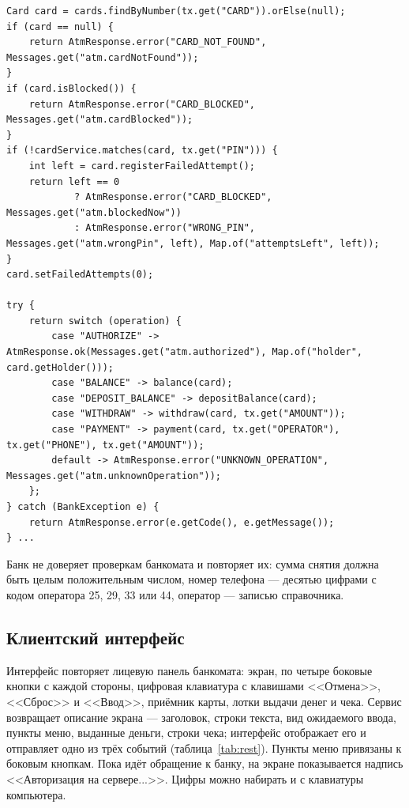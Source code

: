 \documentclass[14pt,a4paper]{extarticle}
\begin{document}
\begin{lstlisting}[style=java, caption={Проверка карты и PIN-кода, выбор операции (\texttt{AtmProcessor.handle})}, label={lst:processor}]
Card card = cards.findByNumber(tx.get("CARD")).orElse(null);
if (card == null) {
    return AtmResponse.error("CARD_NOT_FOUND", Messages.get("atm.cardNotFound"));
}
if (card.isBlocked()) {
    return AtmResponse.error("CARD_BLOCKED", Messages.get("atm.cardBlocked"));
}
if (!cardService.matches(card, tx.get("PIN"))) {
    int left = card.registerFailedAttempt();
    return left == 0
            ? AtmResponse.error("CARD_BLOCKED", Messages.get("atm.blockedNow"))
            : AtmResponse.error("WRONG_PIN", Messages.get("atm.wrongPin", left), Map.of("attemptsLeft", left));
}
card.setFailedAttempts(0);

try {
    return switch (operation) {
        case "AUTHORIZE" -> AtmResponse.ok(Messages.get("atm.authorized"), Map.of("holder", card.getHolder()));
        case "BALANCE" -> balance(card);
        case "DEPOSIT_BALANCE" -> depositBalance(card);
        case "WITHDRAW" -> withdraw(card, tx.get("AMOUNT"));
        case "PAYMENT" -> payment(card, tx.get("OPERATOR"), tx.get("PHONE"), tx.get("AMOUNT"));
        default -> AtmResponse.error("UNKNOWN_OPERATION", Messages.get("atm.unknownOperation"));
    };
} catch (BankException e) {
    return AtmResponse.error(e.getCode(), e.getMessage());
} ...
\end{lstlisting}

Банк не доверяет проверкам банкомата и повторяет их: сумма снятия должна быть целым
положительным числом, номер телефона --- десятью цифрами с кодом оператора 25, 29, 33 или 44,
оператор --- записью справочника.

\subsection{Клиентский интерфейс}

Интерфейс повторяет лицевую панель банкомата: экран, по четыре боковые кнопки с каждой
стороны, цифровая клавиатура с клавишами <<Отмена>>, <<Сброс>> и <<Ввод>>, приёмник карты,
лотки выдачи денег и чека. Сервис возвращает описание экрана --- заголовок, строки текста,
вид ожидаемого ввода, пункты меню, выданные деньги, строки чека; интерфейс отображает его
и отправляет одно из трёх событий (таблица~\ref{tab:rest}). Пункты меню привязаны к боковым
кнопкам. Пока идёт обращение к банку, на экране показывается надпись <<Авторизация на
сервере...>>. Цифры можно набирать и с клавиатуры компьютера.
\end{document}
